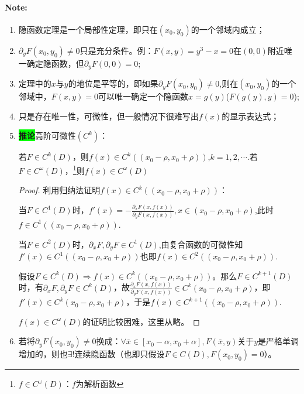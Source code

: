 \documentclass[UTF8]{ctexart}
\begin{document}
        \paragraph{\colorbox{orange!70}{Note:}}
        \begin{enumerate}[(1)]
            \item 隐函数定理是一个局部性定理，即只在$(x_0,y_0)$的一个邻域内成立；
            \item $\partial_yF(x_0,y_0)\not=0$只是充分条件。例：$F(x,y)=y^3-x=0$在$(0,0)$附近唯一确定隐函数，但$\partial_yF(0,0)=0$;
            \item 定理中的$x$与$y$的地位是平等的，即如果$\partial_yF(x_0,y_0)\not=0$,则在$(x_0,y_0)$的一个邻域中，$F(x,y)=0$可以唯一确定一个隐函数$x=g(y)$($F(g(y),y)=0$);
            \item 只是存在唯一性，可微性，但一般情况下很难写出$f(x)$的显示表达式；
            \item \textbf{\colorbox{lime}{推论}}高阶可微性$(C^k)$：
            
            若$F\in C^k(D)$，则$f(x)\in C^k((x_0-\rho,x_0+\rho))$,$k=1,2,\cdots.$若$F\in C^\omega(D)$，\footnote{$f\in C^\omega(D)$：$f$为解析函数}则$f(x)\in C^\omega(D)$

        \begin{proof}
            利用归纳法证明$f(x)\in C^k((x_0-\rho,x_0+\rho))$：

            当$F\in C^1(D)$时，$f'(x)=-\frac{\partial_xF(x,f(x))}{\partial_yF(x,f(x))},x\in(x_0-\rho,x_0+\rho)$,此时$f\in C^1((x_0-\rho,x_0+\rho))$.

            当$F\in C^2(D)$时，$\partial_xF,\partial_yF\in C^1(D)$,由复合函数的可微性知$f'(x)\in C^1((x_0-\rho,x_0+\rho))$也即$f(x)\in C^2((x_0-\rho,x_0+\rho))$.

            假设$F\in C^k(D)\Rightarrow f(x)\in C^k((x_0-\rho,x_0+\rho))$。那么$F\in C^{k+1}(D)$时，有$\partial_xF,\partial_yF\in C^k(D)$，故$\frac{\partial_xF(x,f(x))}{\partial_yF(x,f(x))}\in C^k(x_0-\rho,x_0+\rho)$，即$f'(x)\in C^k(x_0-\rho,x_0+\rho)$，于是$f(x)\in C^{k+1}((x_0-\rho,x_0+\rho))$.

            $f(x)\in C^\omega(D)$的证明比较困难，这里从略。
        \end{proof}
            \item 若将$\partial_yF(x_0,y_0)\not=0$换成：$\forall\bar{x}\in[x_0-\alpha,x_0+\alpha],F(\bar{x},y)$关于$y$是严格单调增加的，则也$\exists!$连续隐函数（也即只假设$F\in C(D),F(x_0,y_0)=0$）。
        \end{enumerate}
        
\end{document}
